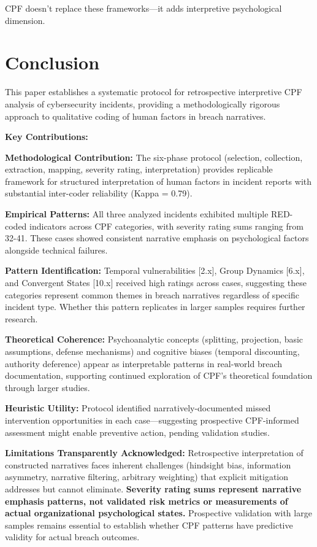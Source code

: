 \documentclass[11pt,a4paper]{article}
\begin{document}
CPF doesn't replace these frameworks—it adds interpretive psychological dimension.

\section{Conclusion}

This paper establishes a systematic protocol for retrospective interpretive CPF analysis of cybersecurity incidents, providing a methodologically rigorous approach to qualitative coding of human factors in breach narratives.

\textbf{Key Contributions:}

\textbf{Methodological Contribution:} The six-phase protocol (selection, collection, extraction, mapping, severity rating, interpretation) provides replicable framework for structured interpretation of human factors in incident reports with substantial inter-coder reliability (Kappa = 0.79).

\textbf{Empirical Patterns:} All three analyzed incidents exhibited multiple RED-coded indicators across CPF categories, with severity rating sums ranging from 32-41. These cases showed consistent narrative emphasis on psychological factors alongside technical failures.

\textbf{Pattern Identification:} Temporal vulnerabilities [2.x], Group Dynamics [6.x], and Convergent States [10.x] received high ratings across cases, suggesting these categories represent common themes in breach narratives regardless of specific incident type. Whether this pattern replicates in larger samples requires further research.

\textbf{Theoretical Coherence:} Psychoanalytic concepts (splitting, projection, basic assumptions, defense mechanisms) and cognitive biases (temporal discounting, authority deference) appear as interpretable patterns in real-world breach documentation, supporting continued exploration of CPF's theoretical foundation through larger studies.

\textbf{Heuristic Utility:} Protocol identified narratively-documented missed intervention opportunities in each case—suggesting prospective CPF-informed assessment might enable preventive action, pending validation studies.

\textbf{Limitations Transparently Acknowledged:} Retrospective interpretation of constructed narratives faces inherent challenges (hindsight bias, information asymmetry, narrative filtering, arbitrary weighting) that explicit mitigation addresses but cannot eliminate. \textbf{Severity rating sums represent narrative emphasis patterns, not validated risk metrics or measurements of actual organizational psychological states.} Prospective validation with large samples remains essential to establish whether CPF patterns have predictive validity for actual breach outcomes.
\end{document}
